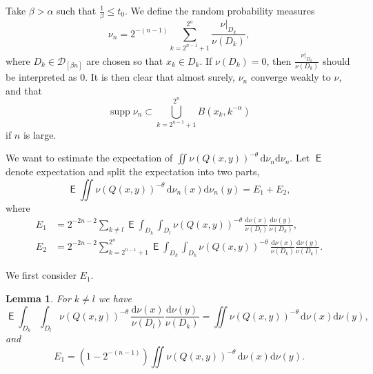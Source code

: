 \documentclass[10pt]{amsart}
\newtheorem{lemm}[theo]{Lemma}\newtheorem{prop}[theo]{Proposition}\newtheorem{coro}[theo]{Corollary}\newtheorem{conj}[theo]{Conjecture}
\theoremstyle{definition}\newtheorem{defi}[theo]{Definition}\newtheorem{rema}[theo]{Remark}\newtheorem{exam}[theo]{Example}\newtheorem{exem}[theo]{Example}\newtheorem{nota}[theo]{Notation}
\DeclareMathOperator{\supp}{supp}
\DeclareMathOperator{\E}{\mathsf{E}}
\newcommand*{\dd}{\mathrm{d}}
\begin{document}
Take $\beta > \alpha$ such that $\frac{1}{\beta} \leq t_0$. We define the random probability measures
\[
\nu_n = 2^{-(n-1)} \sum_{k=2^{n-1}+1}^{2^n} \frac{\nu|_{D_k}}{\nu (D_k)},
\]
where $D_k \in \mathscr{D}_{[\beta n]}$ are chosen so that $x_k \in D_k$. If $\nu (D_k) = 0$, then $\frac{\nu|_{D_k}}{\nu (D_k)}$ should be interpreted as $0$. It is then clear that almost surely, $\nu_n$ converge weakly to $\nu$, and that
\[
\supp \nu_n \subset \bigcup_{k=2^{n-1}+1}^{2^n} B (x_k, k^{-\alpha})
\]
if $n$ is large.

We want to estimate the expectation of $\iint \nu(Q(x,y))^{-\theta} \,
\dd \nu_n \dd \nu_n$. Let $\E$ denote expectation and split the expectation into two parts,
\[
\E \iint \nu (Q(x,y))^{-\theta} \, \dd \nu_n (x) \dd
\nu_n (y) = E_1 + E_2,
\]
where
\begin{align*}
E_1 &= 2^{-2n-2} \sum_{k \neq l} \E \int_{D_k} \int_{D_l} \nu (Q(x,y))^{-\theta} \, \frac{\dd \nu (x)}{\nu (D_l)}
\frac{\dd \nu (y)}{\nu (D_k)}, \\ E_2 &= 2^{-2n-2}
\sum_{k=2^{n-1}+1}^{2^n} \E \int_{D_k} \int_{D_k} \nu (Q(x,y))^{-\theta} \, \frac{\dd \nu (x)}{\nu (D_k)}
\frac{\dd \nu (y)}{\nu (D_k)}.
\end{align*}

We first consider $E_1$.

\begin{lemm}\label{lem:E1}
For $k \neq l$ we have
\[
\E \int_{D_k} \int_{D_l} \nu (Q(x,y))^{-\theta} \, \frac{\dd
\nu (x)}{\nu (D_l)} \frac{\dd \nu (y)}{\nu (D_k)} = \iint
\nu(Q(x,y))^{-\theta} \, \dd \nu (x) \dd \nu (y),
\]
and
\[
E_1 = (1 - 2^{-(n-1)}) \iint \nu(Q(x,y))^{-\theta} \, \dd \nu (x) \dd \nu (y).
\]
\end{lemm}
\end{document}
